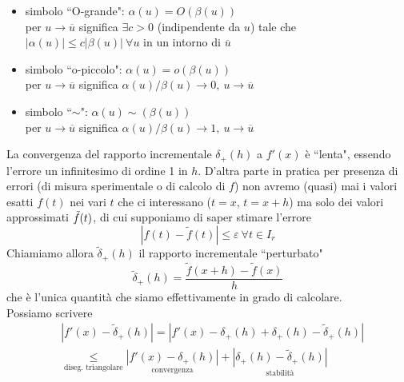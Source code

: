 \documentclass[12pt,a4paper]{article}
\begin{document}
\begin{itemize}
    \item simbolo ``O-grande": $\alpha(u)=O(\beta(u))$ \\
    per $u \rightarrow \overline{u}$ significa $\exists c > 0$ (indipendente da $u$) tale che $|\alpha(u)| \leq c|\beta(u)| \ \forall u$ in un intorno di $\overline{u}$ 
    \item simbolo ``o-piccolo": $\alpha(u)=o(\beta(u))$ \\
    per $u \rightarrow \overline{u}$ significa $\alpha(u) / \beta(u) \rightarrow 0, \ u \rightarrow \overline{u}$
    \item simbolo ``$\sim$": $\alpha(u)\sim(\beta(u))$ \\
    per $u \rightarrow \overline{u}$ significa $\alpha(u) / \beta(u) \rightarrow 1, \ u \rightarrow \overline{u}$
\end{itemize}
La convergenza del rapporto incrementale $\delta_+(h)$ a $f'(x)$ è ``lenta", essendo l'errore un infinitesimo di ordine 1 in $h$.
\newline
D'altra parte in pratica per presenza di errori (di misura sperimentale o di calcolo di $f$) non avremo (quasi) mai i valori esatti $f(t)$ nei vari $t$ che ci interessano ($t=x$, $t=x+h$) ma solo dei valori approssimati $\Tilde{f}(t)$, di cui supponiamo di saper stimare l'errore
\begin{equation*}
    |f(t) - \tilde{f}(t)| \leq \varepsilon \ \forall t \in I_r
\end{equation*}
Chiamiamo allora $\tilde{\delta}_+(h)$ il rapporto incrementale ``perturbato"
\begin{equation*}
    \tilde{\delta}_+(h) = \frac{\tilde{f}(x+h)-\tilde{f}(x)}{h}
\end{equation*}
che è l'unica quantità che siamo effettivamente in grado di calcolare.\\
Possiamo scrivere
\begin{equation*}
    \begin{split}
        & |f'(x)-\tilde{\delta}_+(h)| = |f'(x)-\delta_+(h)+\delta_+(h)-\tilde{\delta}_+(h)| \\
        & \underset{\text{diseg. triangolare}}{\leq} \underset{\text{convergenza}}{|f'(x)-\delta_+(h)|} + \underset{\text{stabilità}}{|\delta_+(h)-\tilde{\delta}_+(h)|}
    \end{split}
\end{equation*}
\end{document}
